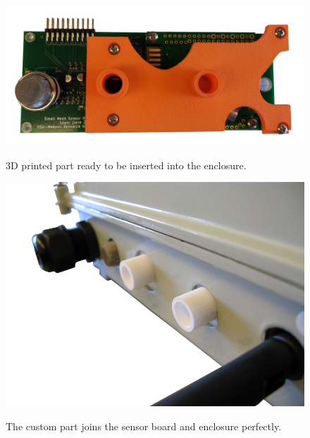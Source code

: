 \documentclass[journal]{IEEEtran}
\begin{document}
\begin{figure}[!t]
	\centering
	{\includegraphics[width=.8\columnwidth,height=0.8\columnwidth,keepaspectratio]{3d5.png}}
	\caption[3D printed part]{3D printed part ready to be inserted into the enclosure.\label{fig:3d5}}
\end{figure}

\begin{figure}[!t]
	\centering
	{\includegraphics[width=.8\columnwidth,height=0.8\columnwidth,keepaspectratio]{3d6.png}}
	\caption[3D printed part joins]{The custom part joins the sensor board and enclosure perfectly.\label{fig:3d6}}
\end{figure}
\end{document}
